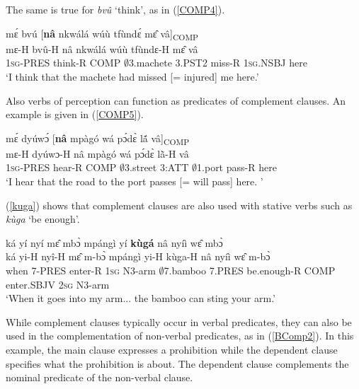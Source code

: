 \noindent The same is true for {\itshape bvû} `think', as in (\ref{COMP4}).

\begin{exe} 
\ex\label{COMP4}
  \glll    mɛ́ bvú [{\bfseries nâ} nkwálá wúù tfùndɛ́ mɛ̂ vâ]\textsubscript{COMP} \\
           mɛ-H bvû-H nâ nkwálá wúù tfùndɛ-H mɛ̂ vâ \\
              1\textsc{sg}-PRES think-R COMP $\emptyset$3.machete 3.PST2 miss-R 1\textsc{sg}.NSBJ here \\
    \trans `I think that the machete had missed [= injured] me here.'
\end{exe}

\noindent Also verbs of perception can function as predicates of complement clauses. An example is given in (\ref{COMP5}).


\begin{exe} 
\ex\label{COMP5} 
  \glll  mɛ́ dyúwɔ́ [{\bfseries nâ} mpàgó wá pɔ́dɛ̀ lã́ vâ]\textsubscript{COMP} \\
        mɛ-H dyúwɔ-H nâ mpàgó wá pɔ́dɛ̀ lã̀-H vâ \\
            1\textsc{sg}-PRES hear-R COMP $\emptyset$3.street 3:ATT $\emptyset$1.port pass-R here \\
    \trans `I hear that the road to the port passes [= will pass] here. '
\end{exe}

(\ref{kuga}) shows that complement clauses are also used with stative verbs such as {\itshape kùga} `be enough'.

\begin{exe} 
\ex\label{kuga}
  \glll    ká yí nyí mɛ̂ mbɔ̀ mpángì yí {\bfseries kùgá} nâ nyíì wɛ̂ mbɔ̀ \\
           ká yi-H nyî-H mɛ̂ m-bɔ̀ mpángì yi-H kùga-H nâ nyíì wɛ̂ m-bɔ̀ \\
             when 7-PRES enter-R 1\textsc{sg} N3-arm $\emptyset$7.bamboo 7.PRES be.enough-R COMP enter.SBJV 2\textsc{sg} N3-arm \\
    \trans `When it goes into my arm... the bamboo can sting your arm.'
\end{exe}

While complement clauses typically occur in verbal predicates, they can also be used in the 
complementation of non-verbal predicates, as in (\ref{BComp2}).
In this example, the main clause expresses a prohibition while the dependent clause specifies what the prohibition is about. The dependent clause complements the nominal predicate of the non-verbal clause.

